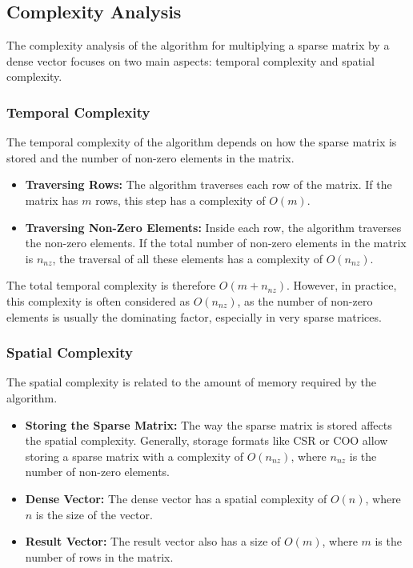 \documentclass[12pt,oneside]{book} %
\begin{document}
\subsection{Complexity Analysis}

The complexity analysis of the algorithm for multiplying a sparse matrix by a
dense vector focuses on two main aspects: temporal complexity and spatial
complexity.

\subsubsection{Temporal Complexity}

The temporal complexity of the algorithm depends on how the sparse matrix is
stored and the number of non-zero elements in the matrix.

\begin{itemize}
    \item \textbf{Traversing Rows:} The algorithm traverses each row of the matrix. If the matrix has \( m \) rows, this step has a complexity of \( O(m) \).
    \item \textbf{Traversing Non-Zero Elements:} Inside each row, the algorithm traverses the non-zero elements. If the total number of non-zero elements in the matrix is \( n_{nz} \), the traversal of all these elements has a complexity of \( O(n_{nz}) \).
\end{itemize}

The total temporal complexity is therefore \( O(m + n_{nz}) \). However, in
practice, this complexity is often considered as \( O(n_{nz}) \), as the number
of non-zero elements is usually the dominating factor, especially in very
sparse matrices.

\subsubsection{Spatial Complexity}

The spatial complexity is related to the amount of memory required by the
algorithm.

\begin{itemize}
    \item \textbf{Storing the Sparse Matrix:} The way the sparse matrix is stored affects the spatial complexity. Generally, storage formats like CSR or COO allow storing a sparse matrix with a complexity of \( O(n_{nz}) \), where \( n_{nz} \) is the number of non-zero elements.
    \item \textbf{Dense Vector:} The dense vector has a spatial complexity of \( O(n) \), where \( n \) is the size of the vector.
    \item \textbf{Result Vector:} The result vector also has a size of \( O(m) \), where \( m \) is the number of rows in the matrix.
\end{itemize}
\end{document}
